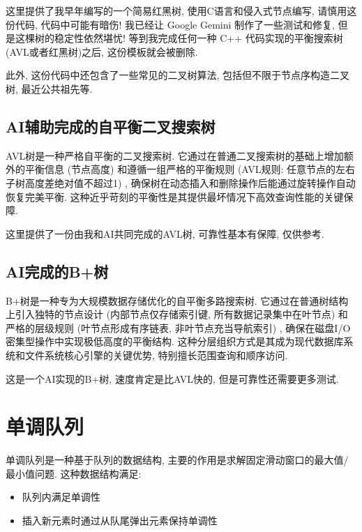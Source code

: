 \documentclass[a4paper]{ctexbook}
\begin{document}
这里提供了我早年编写的一个简易红黑树, 使用C语言和侵入式节点编写, 请慎用这份代码, 代码中可能有暗伤! 我已经让 Google Gemini 制作了一些测试和修复, 但是这棵树的稳定性依然堪忧! 等到我完成任何一种 C++ 代码实现的平衡搜索树(AVL或者红黑树)之后, 这份模板就会被删除.

此外, 这份代码中还包含了一些常见的二叉树算法, 包括但不限于节点序构造二叉树, 最近公共祖先等.



\subsection*{AI辅助完成的自平衡二叉搜索树}

AVL树是一种严格自平衡的二叉搜索树. 它通过在普通二叉搜索树的基础上增加额外的平衡信息 (节点高度) 和遵循一组严格的平衡规则 (AVL规则: 任意节点的左右子树高度差绝对值不超过1) , 确保树在动态插入和删除操作后能通过旋转操作自动恢复完美平衡. 这种近乎苛刻的平衡性是其提供最坏情况下高效查询性能的关键保障.

这里提供了一份由我和AI共同完成的AVL树, 可靠性基本有保障, 仅供参考.



\subsection*{AI完成的B+树}

B+树是一种专为大规模数据存储优化的自平衡多路搜索树. 它通过在普通树结构上引入独特的节点设计 (内部节点仅存储索引键, 所有数据记录集中在叶节点) 和严格的层级规则 (叶节点形成有序链表, 非叶节点充当导航索引) , 确保在磁盘I/O密集型操作中实现极低高度的平衡结构. 这种分层组织方式是其成为现代数据库系统和文件系统核心引擎的关键优势, 特别擅长范围查询和顺序访问.

这是一个AI实现的B+树, 速度肯定是比AVL快的, 但是可靠性还需要更多测试.



\section{单调队列}
单调队列是一种基于队列的数据结构, 主要的作用是求解固定滑动窗口的最大值/最小值问题. 这种数据结构满足:
\begin{itemize}
	\item 队列内满足单调性
	\item 插入新元素时通过从队尾弹出元素保持单调性
\end{itemize}
\end{document}

